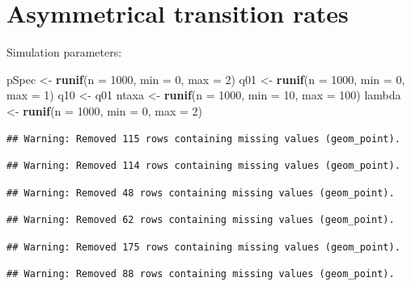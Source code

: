 \documentclass[12pt,]{article}
\newenvironment{Shaded}{\begin{snugshade}}{\end{snugshade}}
\newcommand{\KeywordTok}[1]{\textcolor[rgb]{0.13,0.29,0.53}{\textbf{{#1}}}}
\newcommand{\DataTypeTok}[1]{\textcolor[rgb]{0.13,0.29,0.53}{{#1}}}
\newcommand{\DecValTok}[1]{\textcolor[rgb]{0.00,0.00,0.81}{{#1}}}
\newcommand{\StringTok}[1]{\textcolor[rgb]{0.31,0.60,0.02}{{#1}}}
\newcommand{\NormalTok}[1]{{#1}}
\begin{document}
\section{Asymmetrical transition
rates}\label{asymmetrical-transition-rates}

Simulation parameters:

\begin{Shaded}
\begin{Highlighting}[]
\NormalTok{pSpec <-}\StringTok{ }\KeywordTok{runif}\NormalTok{(}\DataTypeTok{n =} \DecValTok{1000}\NormalTok{, }\DataTypeTok{min =} \DecValTok{0}\NormalTok{, }\DataTypeTok{max =} \DecValTok{2}\NormalTok{)}
\NormalTok{q01 <-}\StringTok{ }\KeywordTok{runif}\NormalTok{(}\DataTypeTok{n =} \DecValTok{1000}\NormalTok{, }\DataTypeTok{min =} \DecValTok{0}\NormalTok{, }\DataTypeTok{max =} \DecValTok{1}\NormalTok{)}
\NormalTok{q10 <-}\StringTok{ }\NormalTok{q01}
\NormalTok{ntaxa <-}\StringTok{ }\KeywordTok{runif}\NormalTok{(}\DataTypeTok{n =} \DecValTok{1000}\NormalTok{, }\DataTypeTok{min =} \DecValTok{10}\NormalTok{, }\DataTypeTok{max =} \DecValTok{100}\NormalTok{)}
\NormalTok{lambda <-}\StringTok{ }\KeywordTok{runif}\NormalTok{(}\DataTypeTok{n =} \DecValTok{1000}\NormalTok{, }\DataTypeTok{min =} \DecValTok{0}\NormalTok{, }\DataTypeTok{max =} \DecValTok{2}\NormalTok{)}
\end{Highlighting}
\end{Shaded}

\begin{verbatim}
## Warning: Removed 115 rows containing missing values (geom_point).
\end{verbatim}

\begin{verbatim}
## Warning: Removed 114 rows containing missing values (geom_point).
\end{verbatim}

\begin{verbatim}
## Warning: Removed 48 rows containing missing values (geom_point).
\end{verbatim}

\begin{verbatim}
## Warning: Removed 62 rows containing missing values (geom_point).
\end{verbatim}

\begin{verbatim}
## Warning: Removed 175 rows containing missing values (geom_point).
\end{verbatim}

\begin{verbatim}
## Warning: Removed 88 rows containing missing values (geom_point).
\end{verbatim}
\end{document}
